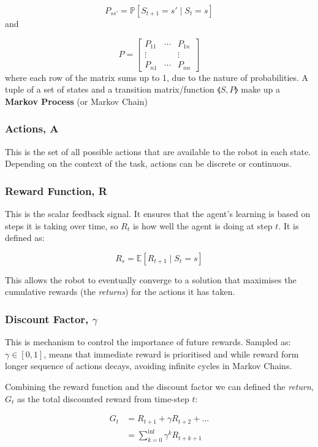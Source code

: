     \[ P_{ss'} = \mathbb{P} \left[S_{t+1} = s'  \mid S_t = s\right]\] 
    and 
    
    \[ P =
    \begin{bmatrix}
      P_{11} & \cdots & P_{1n} \\ 
      \vdots & & \vdots\\
      P_{n1} & \cdots & P_{nn}
    \end{bmatrix}
    \]
    where each row of the matrix sums up to 1, due to the nature of probabilities. A tuple of a set of states and a transition matrix/function \(\llangle S, P \rrangle\) make up a \textbf{Markov Process} (or Markov Chain)

  \subsubsection{Actions, A}
    This is the set of all possible actions that are available to the robot in each state. Depending on the context of the task, actions can be discrete or continuous.

  \subsubsection{Reward Function, R}
    This is the scalar feedback signal. It ensures that the agent's learning is based on steps it is taking over time, so $R_t$ is how well the agent is doing at step $t$. It is defined as:

    \[R_s = \mathbb{E} \left[R_{t+1} \mid S_t = s\right]\]
    
    This allows the robot to eventually converge to a solution that maximises the cumulative rewards (the \emph{returns}) for the actions it has taken. 
  
  \subsubsection{Discount Factor, $\gamma$}
    This is mechanism to control the importance of future rewards. Sampled as: \(\gamma \in \left[0, 1\right]\), means that immediate reward is prioritised and while reward form longer sequence of actions decays, avoiding infinite cycles in Markov Chains.

    Combining the reward function and the discount factor we can defined the \emph{return}, $G_t$ as the total discounted reward from time-step $t$:

    \[ 
    \begin{aligned}
      G_t &= R_{t+1} + \gamma R_{t+2} + \ldots \\ 
      &= \sum_{k=0}^{\inf}\gamma^k R_{t+k+1} 
    \end{aligned}
    \]
    
